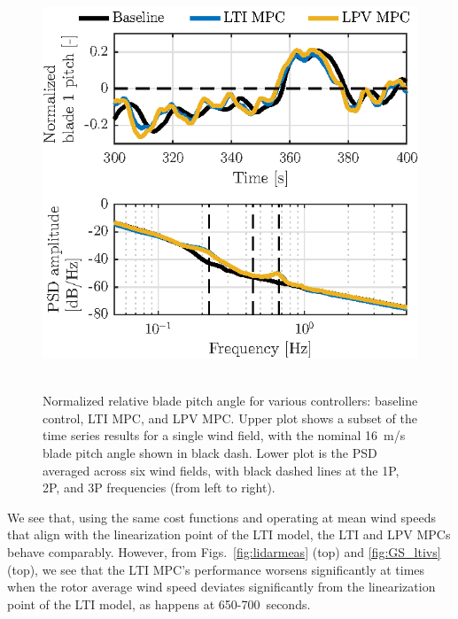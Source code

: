 \documentclass[letterpaper, 10 pt, conference]{ieeeconf}  %
\begin{document}
\begin{figure}[thbp]
	\centering
	\mbox{\includegraphics[scale=1.0]{B1_ltivs.eps}
	}
	\caption{Normalized relative blade pitch angle for various controllers: baseline control, LTI MPC, and LPV MPC. Upper plot shows a subset of the time series results for a single wind field, with the nominal 16~m/s blade pitch angle shown in black dash. Lower plot is the PSD averaged across six wind fields, with black dashed lines at the 1P, 2P, and 3P frequencies (from left to right).}
	\label{fig:B1_ltivs}
\end{figure}

We see that, using the same cost functions and operating at mean wind speeds that align with the linearization point of the LTI model, the LTI and LPV MPCs behave comparably. However, from Figs.~\ref{fig:lidarmeas} (top) and \ref{fig:GS_ltivs} (top), we see that the LTI MPC's performance worsens significantly at times when the rotor average wind speed deviates significantly from the linearization point of the LTI model, as happens at 650-700~seconds. 
\end{document}
